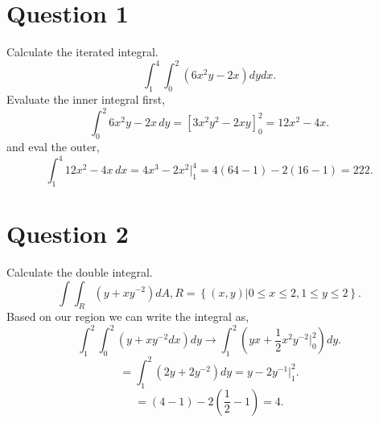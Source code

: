 \section{Question 1}%
\label{sec: Question 1 }
Calculate the iterated integral.
\[
\int_{ 1 }^{ 4 } \int_{ 0 }^{ 2 } \left( 6x^2y-2x \right) dydx
.\] 
Evaluate the inner integral first,
\[
\int_{ 0 }^{ 2 } 6x^2y-2x \, dy = \left[ 3x^2y^2-2xy \right]_{ 0 }^{ 2 } = 12x^2-4x
.\] 
and eval the outer,
\[
\int_{ 1 }^{ 4 } 12x^2-4x \, dx = 4x^3-2x^2 \bigg|_{ 1 }^{ 4 } = 4\left( 64-1 \right) -2\left( 16-1 \right) = 222
.\] 

\section{Question 2}%
\label{sec: Question 2 }
Calculate the double integral.
\[
\int \!\!\!\!\!\int_{ R }^{  } \left( y+xy^{ -2 } \right) dA, R = \left\{ \left( x,y \right) \big|0\le x\le 2, 1 \le y \le 2 \right\} 
.\] 
Based on our region we can write the integral as,
\[
\int_{ 1 }^{ 2 } \int_{ 0 }^{ 2 } \left( y+xy^{ -2 }dx \right) dy \to \int_{ 1 }^{ 2 } \left( yx+\frac{ 1 }{ 2 } x^2y^{ -2 } \bigg|_{ 0 }^{ 2 } \right)dy 
.\] 
\[
=\int_{ 1 }^{ 2 } \left( 2y+2y^{ -2 } \right) dy = y - 2y^{ -1 }\bigg|_{ 1 }^{ 2 }
.\]
\[
= \left( 4-1 \right) - 2\left( \frac{ 1 }{ 2 } -1 \right) =4
.\]
